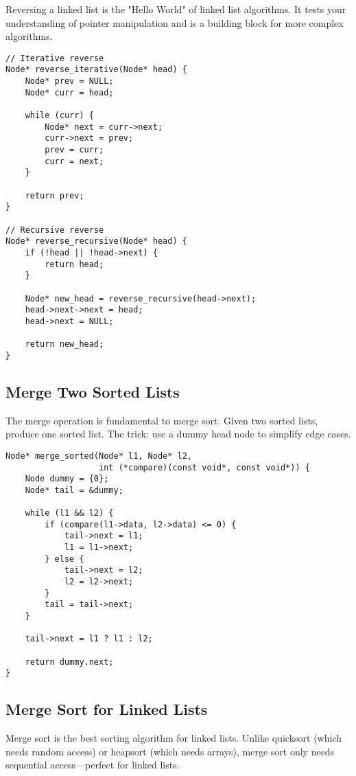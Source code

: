 Reversing a linked list is the "Hello World" of linked list algorithms. It tests your understanding of pointer manipulation and is a building block for more complex algorithms.

\begin{lstlisting}
// Iterative reverse
Node* reverse_iterative(Node* head) {
    Node* prev = NULL;
    Node* curr = head;

    while (curr) {
        Node* next = curr->next;
        curr->next = prev;
        prev = curr;
        curr = next;
    }

    return prev;
}

// Recursive reverse
Node* reverse_recursive(Node* head) {
    if (!head || !head->next) {
        return head;
    }

    Node* new_head = reverse_recursive(head->next);
    head->next->next = head;
    head->next = NULL;

    return new_head;
}
\end{lstlisting}

\subsection{Merge Two Sorted Lists}

The merge operation is fundamental to merge sort. Given two sorted lists, produce one sorted list. The trick: use a dummy head node to simplify edge cases.

\begin{lstlisting}
Node* merge_sorted(Node* l1, Node* l2,
                   int (*compare)(const void*, const void*)) {
    Node dummy = {0};
    Node* tail = &dummy;

    while (l1 && l2) {
        if (compare(l1->data, l2->data) <= 0) {
            tail->next = l1;
            l1 = l1->next;
        } else {
            tail->next = l2;
            l2 = l2->next;
        }
        tail = tail->next;
    }

    tail->next = l1 ? l1 : l2;

    return dummy.next;
}
\end{lstlisting}

\subsection{Merge Sort for Linked Lists}

Merge sort is the best sorting algorithm for linked lists. Unlike quicksort (which needs random access) or heapsort (which needs arrays), merge sort only needs sequential access—perfect for linked lists.

